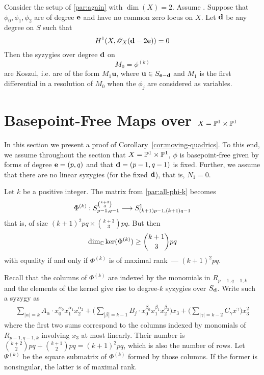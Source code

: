 \documentclass[fleqn,reqno]{amsart}
\begin{document}
\begin{proposition}
\label{prop:koszul-syzygies}
Consider the setup of \eqref{par:again} with $\dim(X)=2$.
Assume .
Suppose that $\phi_0,\phi_1,\phi_2$ are of degree $\mathbf e$ and have no common zero locus on $X$.
Let $\mathbf d$ be any degree on $S$ such that
\[
	H^1(X,\mathscr{O}_X(\mathbf d-2\mathbf e))=0
\]
Then the syzygies over degree $\mathbf d$ on
\[
	M_0=\phi^{(k)}
\]
are Koszul, i.e. are of the form $M_1{\mathbf u}$,
where $\mathbf u\in S_{\mathbf e-\mathbf d}$
and $M_1$ is the first differential in a resolution of $M_0$
when the $\phi_j$ are considered as variables.
\end{proposition}



\section{Basepoint-Free Maps over $X=\mathbb{P}^1\times\mathbb{P}^1$}
\label{sec:moving-quadrics}

\begin{paragraf*}
In this section we present a proof of Corollary~\ref{cor:moving-quadrics}.
To this end, we assume throughout the section that $X=\mathbb{P}^1\times\mathbb{P}^1$,
$\phi$ is basepoint-free given by forms of degree $\mathbf e=(p,q)$
and that $\mathbf d=(p-1,q-1)$ is fixed.
Further, we assume that there are no linear syzygies (for the fixed $\mathbf d$),
that is, $N_1=0$.
\end{paragraf*}

\begin{paragraph}
\label{par:count-rels}
Let $k$ be a positive integer.
The matrix from \eqref{par:all-phi-k} becomes
\[
	\Phi^{(k)}:S_{p-1,q-1}^{\binom{k+3}{3}}\longrightarrow S_{(k+1)p-1,(k+1)q-1}^1
\]
that is, of size $(k+1)^2pq\times\binom{k+3}{3}pq$.
But then
\begin{align}
	\dim_{\mathbb{C}}\ker(\Phi^{(k)})\geq\binom{k+1}{3}pq\label{eqn1}
\end{align}
with equality if and only if $\Phi^{(k)}$ is of maximal rank~--- $(k+1)^2pq$.
\end{paragraph}

\begin{paragraph}
Recall that the columns of $\Phi^{(k)}$ are indexed
by the monomials in $R_{p-1,q-1,k}$
and the elements of the kernel give rise to degree-$k$ syzygies over $S_\mathbf d$.
Write such a syzygy as
\begin{align}\label{ebasi}
	\sum_{|\alpha|=k} A_\alpha\cdot
	x_0^{\alpha_0}x_1^{\alpha_1}x_2^{\alpha_2}+
	\big(\sum_{|\beta|=k-1} B_{j}\cdot
	x_0^{\beta_0}x_1^{\beta_1}x_2^{\beta_2}\big)x_3+
	\big(\sum_{|\gamma|=k-2}C_\gamma x^\gamma\big)x_3^2
\end{align}
where the first two sums correspond to
the columns indexed by monomials of $R_{p-1,q-1,k}$ involving $x_3$ at most linearly.
Their number is $\binom{k+2}{2}pq+\binom{k+1}{2}pq=(k+1)^2pq$,
which is also the number of rows.
Let $\Psi^{(k)}$ be the square submatrix of $\Phi^{(k)}$ formed by those columns.
If the former is nonsingular, the latter is of maximal rank.
\end{paragraph}
\end{document}
